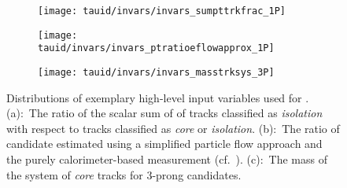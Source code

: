 \begin{figure}[htbp]
  \centering

  \begin{subfigure}{0.33\textwidth}
    \texttt{[image: tauid/invars/invars\_sumpttrkfrac\_1P]}
    \subcaption{}
  \end{subfigure}\hfill%
  \begin{subfigure}{0.33\textwidth}
    \texttt{[image: tauid/invars/invars\_ptratioeflowapprox\_1P]}
    \subcaption{}
  \end{subfigure}\hfill%
  \begin{subfigure}{0.33\textwidth}
    \texttt{[image: tauid/invars/invars\_masstrksys\_3P]}
    \subcaption{}
  \end{subfigure}

  \caption{Distributions of exemplary high-level input variables used
    for \tauid. (a):~The ratio of the scalar sum of \pT of tracks
    classified as \emph{isolation} with respect to tracks classified
    as \emph{core} or \emph{isolation}. (b):~The ratio of \tauhadvis
    candidate \pT estimated using a simplified particle flow approach
    and the purely calorimeter-based measurement
    (cf.~). (c):~The mass of the
    system of \emph{core} tracks for 3-prong \tauhadvis candidates.}%
  \label{fig:tauid_high_level_vars}
\end{figure}








